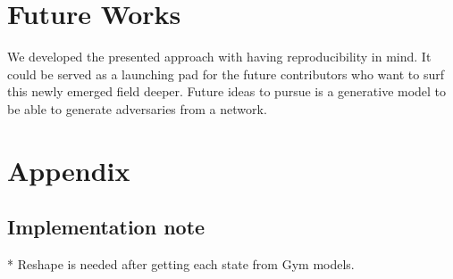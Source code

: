 \documentclass{article}
\begin{document}

 

\section{Future Works}
We developed the presented approach with having reproducibility in mind. It could be served as a launching pad for the future contributors who want to surf this newly emerged field deeper. Future ideas to pursue is a generative model to be able to generate adversaries from a network.

\section*{Appendix}

\subsection{Implementation note}
* Reshape is needed after getting each state from Gym models. 











\end{document}
